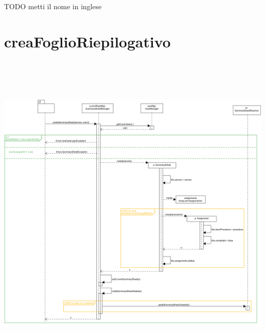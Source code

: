 \color{red}\huge{TODO metti il nome in inglese}\color{black}
\section{creaFoglioRiepilogativo}
\centering\includegraphics[max width=\textwidth, max height=158mm]{../resources/img/GCC/DSD/op1.png}

